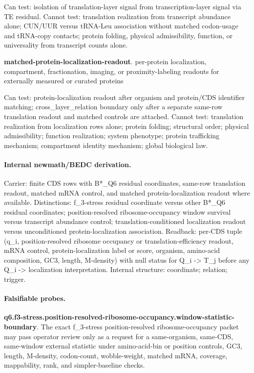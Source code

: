 Can test: isolation of translation-layer signal from transcription-layer signal via TE residual. Cannot test: translation realization from transcript abundance alone; CUN/UUR versus tRNA-Leu association without matched codon-usage and tRNA-copy contacts; protein folding, physical admissibility, function, or universality from transcript counts alone.

\textbf{matched-protein-localization-readout}. per-protein localization, compartment, fractionation, imaging, or proximity-labeling readouts for externally measured or curated proteins

Can test: protein-localization readout after organism and protein/CDS identifier matching; cross\_layer\_relation boundary only after a separate same-row translation readout and matched controls are attached. Cannot test: translation realization from localization rows alone; protein folding; structural order; physical admissibility; function realization; system phenotype; protein trafficking mechanism; compartment identity mechanism; global biological law.

\paragraph{Internal newmath/BEDC derivation.} Carrier: finite CDS rows with B*\_Q6 residual coordinates, same-row translation readout, matched mRNA control, and matched protein-localization readout where available. Distinctions: f\_3-stress residual coordinate versus other B*\_Q6 residual coordinates; position-resolved ribosome-occupancy window survival versus transcript abundance control; translation-conditioned localization readout versus unconditioned protein-localization association. Readback: per-CDS tuple (q\_i, position-resolved ribosome occupancy or translation-efficiency readout, mRNA control, protein-localization label or score, organism, amino-acid composition, GC3, length, M-density) with null status for Q\_i -> T\_j before any Q\_i -> localization interpretation. Internal structure: coordinate; relation; trigger.

\paragraph{Falsifiable probes.}
\textbf{q6.f3-stress.position-resolved-ribosome-occupancy.window-statistic-boundary}. The exact f\_3-stress position-resolved ribosome-occupancy packet may pass operator review only as a request for a same-organism, same-CDS, same-window external statistic under amino-acid-bin or position controls, GC3, length, M-density, codon-count, wobble-weight, matched mRNA, coverage, mappability, rank, and simpler-baseline checks.

